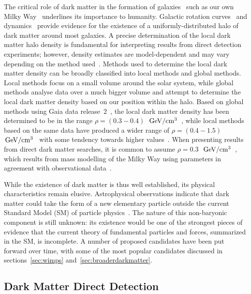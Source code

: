 The critical role of dark matter in the formation of galaxies~\cite{Silk:2012ra} such as our own Milky Way~\cite{Read:2014qva} underlines its importance to humanity. Galactic rotation curves~\cite{Salucci:1996bf,Richards:2015gla} and dynamics~\cite{Sofue:2000jx,Foster:2010ri} provide evidence for the existence of a uniformly-distributed halo of dark matter around most galaxies. A precise determination of the local dark matter halo density is fundamental for interpreting results from direct detection experiments; however, density estimates are model-dependent and may vary depending on the method used~\cite{Read:2014qva,deSalas:2019rdi}. Methods used to determine the local dark matter density can be broadly classified into local methods and global methods. Local methods focus on a small volume around the solar system, while global methods analyse data over a much bigger volume and attempt to determine the local dark matter density based on our position within the halo. Based on global methods using Gaia data release~2~\cite{Brown:2018dum}, the local dark matter density has been determined to be in the range $\rho = (0.3-0.4)$~$\, \mathrm{GeV/cm^3}$~\cite{deSalas:2019pee}, while local methods based on the same data have produced a wider range of $\rho = (0.4-1.5)$~$\, \mathrm{GeV/cm^3}$~\cite{Hagen18,Buch:2018qdr,Widmark:2018ylf} with some tendency towards higher values~\cite{Wu:2019nhd}. When presenting results from direct dark matter searches, it is common to assume $\rho = 0.3$~$\, \mathrm{GeV/cm^3}$~\cite{Baxter:2021pqo}, which results from mass modelling of the Milky Way using parameters in agreement with observational data~\cite{Green:2011bv}.

While the existence of dark matter is thus well established, its physical characteristics remain elusive. Astrophysical observations indicate that dark matter could take the form of a new elementary particle outside the current Standard Model (SM) of particle physics~\cite{Tanabashi:2018oca}. The nature of this non-baryonic component is still unknown: its existence would be one of the strongest pieces of evidence that the current theory of fundamental particles and forces, summarized in the SM, is incomplete. A number of proposed candidates have been put forward over time, with some of the most popular candidates discussed in sections~\ref{sec:wimps} and~\ref{sec:broaderdarkmatter}.

\subsection{Dark Matter Direct Detection}

